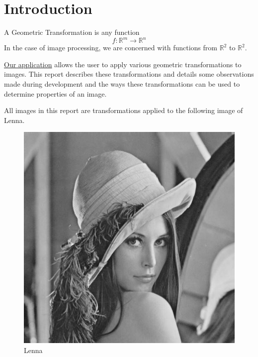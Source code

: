 \section{Introduction}

A Geometric Transformation is any function \[f:\mathbb{R}^m\to\mathbb{R}^n\] In the case of image processing, we are concerned with functions from $\mathbb{R}^2$ to $\mathbb{R}^2$.

\href{https://github.com/TetroVolt/DIP-Project}{Our application} allows the user to apply various geometric transformations to images. This report describes these transformations and details some observations made during development and the ways these transformations can be used to determine properties of an image. 

All images in this report are transformations applied to the following image of Lenna.

\begin{figure}[H]
    \centering
    \includegraphics[scale=0.5]{images/lenna-grey.jpg}
    \caption{Lenna}
    \label{fig:lenna-original}
\end{figure}